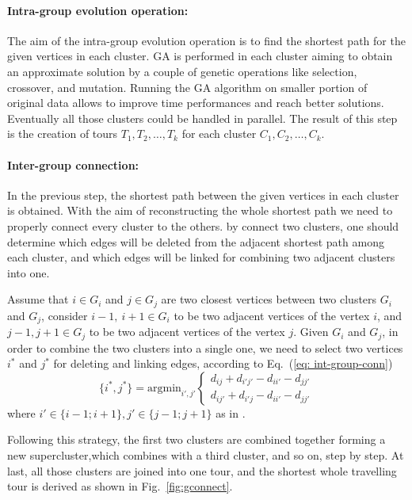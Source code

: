 \documentclass[10pt]{article}
\begin{document}
\paragraph{Intra-group evolution operation:}
The aim of the intra-group evolution operation is to find the shortest path for the given vertices in each cluster.
GA is performed in each cluster aiming to obtain an approximate solution by a couple of genetic operations like selection, crossover, and mutation.
Running the GA algorithm on smaller portion of original data allows to improve time performances and reach better solutions.
Eventually all those clusters could be handled in parallel.
The result of this step is the creation of tours $T_1,T_2,\dots,T_k$ for each cluster  $C_1,C_2,…,C_k$.

\paragraph{Inter-group connection:}
In the previous step, the shortest path between the given vertices in each cluster is obtained.
With the aim of reconstructing the whole shortest path we need to properly connect every cluster to the others.
by connect two clusters, one should determine which edges will be deleted from the adjacent shortest path among each cluster, and which edges will be linked for combining two adjacent clusters into one.
 
Assume that $i \in G_i$ and $j \in G_j$ are two closest vertices between two clusters $G_i$ and $G_j$, consider $i−1,~i+1 \in G_i$ to be two adjacent vertices of the vertex $i$, and $j−1,j+1 \in G_j$ to be two adjacent vertices of the vertex $j$. 
Given $G_i$ and $G_j$, in order to combine the two clusters into a single one, we need to select two vertices $i^*$ and $j^*$ for deleting and linking edges, according to Eq.~(\ref{eq: int-group-conn}) 
\begin{equation}
\{i^*,j^*\} = \mathrm{arg min}_{i',j'} 
\begin{cases}
d_{ij} + d_{i'j'} - d_{ii'} - d_{jj'}\\d_{ij'} + d_{i'j} - d_{ii'} - d_{jj'}
\end{cases}
\label{eq: int-group-conn}
\end{equation}
where $i' \in \{i-1; i+1\}, j' \in \{j-1;j+1\}$ as in \cite{ventitre}. %

Following this strategy, the first two clusters are combined together forming a new supercluster,which combines with a third cluster, and so on, step by step. 
At last, all those clusters are joined into one tour, and the shortest whole travelling tour is derived as shown in Fig.~\ref{fig:gconnect}.
\end{document}
